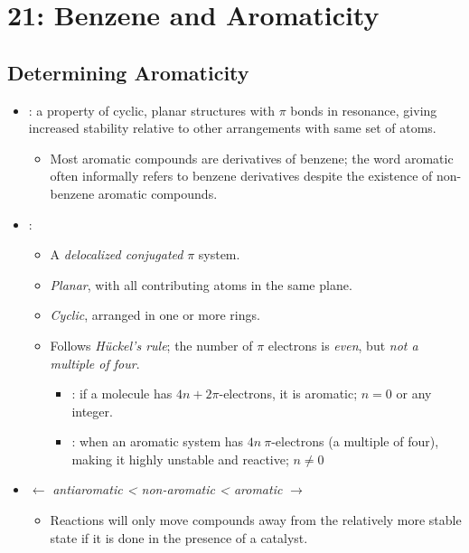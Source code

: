 \chapter{21: Benzene and Aromaticity}\label{21: Benzene and Aromaticity}

\section{Determining Aromaticity}\label{Determining Aromaticity}
\begin{itemize}
  \item {}: a property of cyclic, planar structures with \(\pi \) bonds in resonance, giving increased stability relative to other arrangements with same set of atoms.
  \begin{itemize}
    \item Most aromatic compounds are derivatives of benzene; the word aromatic often informally refers to benzene derivatives despite the existence of non-benzene aromatic compounds.
  \end{itemize}
  \item {}:
    \begin{itemize}
      \item A \emph{delocalized conjugated} \(\pi \) system.
      \item \emph{Planar}, with all contributing atoms in the same plane.
      \item \emph{Cyclic}, arranged in one or more rings.
      \item Follows \emph{H\"uckel's rule}; the number of \(\pi \) electrons is \emph{even}, but \emph{not a multiple of four}.
        \begin{itemize}
          \item {}: if a molecule has \(4n + 2\pi \)-electrons, it is aromatic; \(n= 0\) or any integer.
          \item {}: when an aromatic system has \(4n~\pi \)-electrons (a multiple of four), making it highly unstable and reactive; \(n\neq 0\)
        \end{itemize}
    \end{itemize}
  \item {} \(\leftarrow \) \emph{antiaromatic < non-aromatic < aromatic} \(\rightarrow \) 
    \begin{itemize}
      \item Reactions will only move compounds away from the relatively more stable state if it is done in the presence of a catalyst.

\end{itemize}
\end{itemize}
